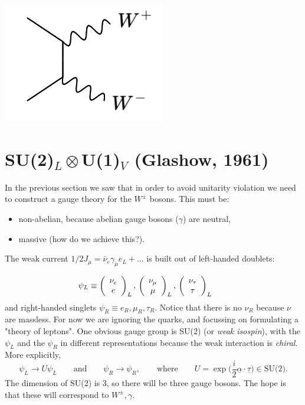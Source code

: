 \documentclass[a4paper,12pt]{article}
\begin{document}
%
  \includegraphics[width=0.4\linewidth]{figs/18d.png}
%
\newpage
%
\section{SU(2)$_L \otimes$U(1)$_V$ (Glashow, 1961)}
%
In the previous section we saw that in order to avoid unitarity violation we need to construct a gauge theory for the $W^\pm$ bosons. This must be:
\begin{itemize}
\item non-abelian, because abelian gauge bosons ($\gamma$) are neutral,
\item massive (how do we achieve this?).
\end{itemize}
The weak current $1/2 J_\mu = \bar{\nu}_e\gamma_\mu e_L + ...$ is built out of left-handed doublets:

\[ \psi_L \equiv \left( \begin{array}{cc}
\nu_e   \\
e   \end{array} \right)_L, \qquad
  \\ \left( \begin{array}{cc}
 \nu_\mu \\
\mu   \end{array} \right)_L, \qquad  \\ 
\left( \begin{array}{cc}
 \nu_\tau \\
\tau   \end{array} \right)_L \qquad\] 
and right-handed singlets 
$\psi_R \equiv e_R, \mu_R, \tau_R$. Notice that there is no $\nu_R$ because $\nu$ are massless. For now we are ignoring the quarks, and focussing on formulating a "theory of leptons". One obvious gauge group is SU(2) (or \textit{weak isospin}), with the $\psi_L$ and the $\psi_R$ in different representations because the weak interaction is \textit{chiral}. More explicitly,
\begin{equation}
\psi_L \to U \psi_L \qquad \text{and} \qquad \psi_R \to \psi_R, \qquad \text{where} \qquad U=\exp\bigg(\frac{i}{2}\underline{\alpha}\cdot\underline{\tau}\bigg) \in \text{SU(2)}.
\end{equation}
The dimension of SU(2) is 3, so there will be three gauge bosons. The hope is that these will correspond to $W^\pm, \gamma$. 
\end{document}
